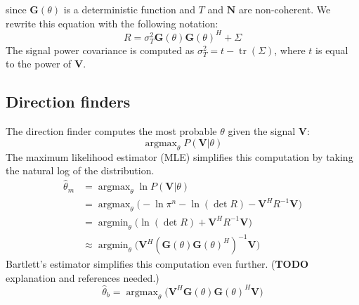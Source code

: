 \documentclass[letter]{article}
\DeclareMathOperator*{\argmax}{argmax}
\DeclareMathOperator*{\argmin}{argmin}
\DeclareMathOperator*{\trace}{tr}
\begin{document}
since $\mathbf{G}(\theta)$ is a deterministic function and $T$ and $\mathbf{N}$ are non-coherent. 
We rewrite this equation with the following notation: 
\begin{equation}
    R = \sigma_T^2\mathbf{G}(\theta)\mathbf{G}(\theta)^H + \Sigma
\end{equation}
The signal power covariance is computed as $\sigma_T^2 = t - \trace{(\Sigma)}$, where 
$t$ is equal to the power of $\mathbf{V}$. 



  \subsection{Direction finders}
The direction finder computes the most probable $\theta$ given the signal $\mathbf{V}$:
$$ \argmax_\theta{P( \mathbf{V} | \theta )}$$
The maximum likelihood estimator (MLE) simplifies this computation by taking the natural log 
of the distribution.
\begin{equation}
  \begin{aligned}
    \hat{\theta}_{m} &= \argmax_\theta{ \ln{P(\mathbf{V} | \theta)} } \\
                 &= \argmax_\theta{\big( -{\ln{\pi^n}} - \ln{(\det{R})} - 
                      \mathbf{V}^HR^{-1}\mathbf{V} \big)} \\ 
                 &= \argmin_\theta{\big( \ln{(\det{R})} + \mathbf{V}^HR^{-1}\mathbf{V} \big)} \\
                 &\approx \argmin_\theta{\big( \mathbf{V}^H
                    (\mathbf{G}(\theta)\mathbf{G}(\theta)^H)^{-1}
                    \mathbf{V} \big)}
  \end{aligned}
\end{equation}
Bartlett's estimator simplifies this computation even further. (\textbf{TODO} explanation 
and references needed.)
\begin{equation} \label{eq:bartlett}
  \hat{\theta}_b = \argmax_\theta{\big( \mathbf{V}^H
        \mathbf{G}(\theta)\mathbf{G}(\theta)^H\mathbf{V} \big)}
\end{equation}
\end{document}
